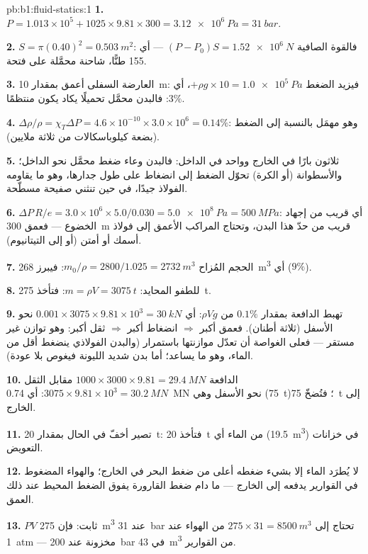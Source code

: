\begin{solution}{pb:b1:fluid-statics:1}
\textbf{1.} $P = 1.013\times10^5 + 1025 \times 9.81 \times 300 = \qty{3.12e6}{Pa}
= \qty{31}{bar}$.

\textbf{2.} $S = \pi(0.40)^2 = \qty{0.503}{m^2}$: فالقوة الصافية $(P - P_0)S =
\qty{1.52e6}{N}$ --- أي 155 طنًّا، شاحنة محمَّلة على فتحة.

\textbf{3.} العارضة السفلى أعمق بمقدار \qty{10}{m}: فيزيد الضغط $+\rho g \times 10 = \qty{1.0e5}{Pa}$،
أي $3\%$: فالبدن محمَّل تحميلًا يكاد يكون منتظمًا.

\textbf{4.} $\Delta\rho/\rho = \chi_T\Delta P = 4.6\times10^{-10} \times 3.0\times10^6
= 0.14\%$: وهو مهمَل بالنسبة إلى الضغط (بضعة كيلوباسكالات من
ثلاثة ملايين).

\textbf{5.} ثلاثون بارًا في الخارج وواحد في الداخل: فالبدن وعاء
ضغط محمَّل نحو الداخل؛ والأسطوانة (أو الكرة) تحوّل الضغط
إلى انضغاط على طول جدارها، وهو ما يقاومه الفولاذ جيدًا،
في حين تنثني صفيحة مسطّحة.

\textbf{6.} $\Delta P\,R/e = 3.0\times10^6 \times 5.0/0.030 = \qty{5.0e8}{Pa}
= \qty{500}{MPa}$: أي قريب من إجهاد الخضوع --- فعمق \qty{300}{m} قريب من
حدّ هذا البدن، وتحتاج المراكب الأعمق إلى فولاذ أسمك أو أمتن
(أو إلى التيتانيوم).

\textbf{7.} الحجم المُزاح $m_0/\rho = 2800/1.025 = \qty{2732}{m^3}$: فيبرز \qty{268}{m^3}
أي ($9\%$).

\textbf{8.} للطفو المحايد: $m = \rho V = \qty{3075}{t}$: فتأخذ \qty{275}{t}.

\textbf{9.} تهبط الدافعة بمقدار $0.1\%$ من $\rho Vg$: أي $0.001 \times 3075 \times 9.81
\times10^3 = \qty{30}{kN}$ نحو الأسفل (ثلاثة أطنان). فعمق أكبر $\Rightarrow$ انضغاط
أكبر $\Rightarrow$ ثقل أكبر: وهو توازن غير مستقر --- فعلى الغواصة أن
تعدّل موازنتها باستمرار (والبدن الفولاذي ينضغط أقل من الماء، وهو ما يساعد؛
أما بدن شديد الليونة فيغوص بلا عودة).

\textbf{10.} الدافعة $1000 \times 3000 \times 9.81 = \qty{29.4}{MN}$ مقابل
الثقل $3075 \times 9.81 \times 10^3 = \qty{30.2}{MN}$: أي \qty{0.74}{MN} نحو الأسفل
وهي (\qty{75}{t})؛ فتُضخّ \qty{75}{t} إلى الخارج.

\textbf{11.} تصير أخفّ في الحال بمقدار \qty{20}{t}: فتأخذ \qty{20}{t} من الماء
أي (\qty{19.5}{m^3}) في خزانات التعويض.

\textbf{12.} لا يُطرَد الماء إلا بشيء ضغطه أعلى من ضغط البحر
في الخارج؛ والهواء المضغوط في القوارير يدفعه إلى الخارج ---
ما دام ضغط القارورة يفوق الضغط المحيط عند ذلك
العمق.

\textbf{13.} $PV$ ثابت: فإن \qty{275}{m^3} عند \qty{31}{bar} تحتاج إلى $275 \times 31
= \qty{8500}{m^3}$ من الهواء عند \qty{1}{atm} --- مخزونة عند \qty{200}{bar} في
\qty{43}{m^3} من القوارير.


\end{solution}
